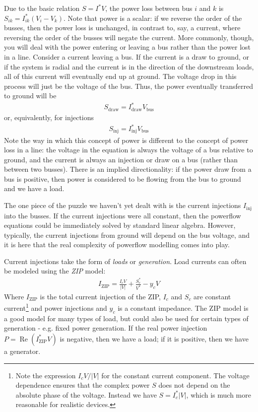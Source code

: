 \documentclass[11pt]{article}
\newcommand{\re}[1]{\ensuremath{\operatorname{Re}(#1)}}
\begin{document}
Due to the basic relation $S = I^*V$, the power loss between bus $i$ and $k$ is $S_{ik} = I_{ik}^*(V_i - V_k)$. Note that power is a scalar: if we reverse the order of the busses, then the power loss is unchanged, in contrast to, say, a current, where reversing the order of the busses will negate the current. More commonly, though, you will deal with the power entering or leaving a bus rather than the power lost in a line. Consider a current leaving a bus. If the current is a draw to ground, or if the system is radial and the current is in the direction of the downstream loads, all of this current will eventually end up at ground. The voltage drop in this process will just be the voltage of the bus. Thus, the power eventually transferred to ground will be 
\begin{align}
	S_\text{draw} = I_\text{draw}^*V_\text{bus}
\end{align}
or, equivalently, for injections
\begin{align}
	S_\text{inj} = I_\text{inj}^*V_\text{bus}
\end{align}
Note the way in which this concept of power is different to the concept of power loss in a line: the voltage in the equation is always the voltage of a bus relative to ground, and the current is always an injection or draw on a bus (rather than between two busses). There is an implied directionality: if the power draw from a bus is positive, then power is considered to be flowing from the bus to ground and we have a load.

The one piece of the puzzle we haven't yet dealt with is the current injections $I_\text{inj}$ into the busses. If the current injections were all constant, then the powerflow equations could be immediately solved by standard linear algebra. However, typically, the current injections from ground will depend on the bus voltage, and it is here that the real complexity of powerflow modelling comes into play.

Current injections take the form of \emph{loads} or \emph{generation}. Load currents can often be modeled using the \emph{ZIP} model:
\begin{align}
	I_\text{ZIP} = \frac{I_cV}{|V|} + \frac{S^*_c}{V^*} - y_cV
\end{align}
Where $I_\text{ZIP}$ is the total current injection of the ZIP, $I_c$ and $S_c$ are constant current\footnote{Note the expression $I_cV/|V|$ for the constant current component. The voltage dependence ensures that the complex power $S$ does not depend on the absolute phase of the voltage. Instead we have $S = I^*_c |V|$, which is much more reasonable for realistic devices.} and power injections and $y_c$ is a constant impedance. The ZIP model is a good model for many types of load, but could also be used for certain types of generation - e.g. fixed power generation. If the real power injection $P = \re{I_\text{ZIP}^*V}$ is negative, then we have a load; if it is positive, then we have a generator.
\end{document}
